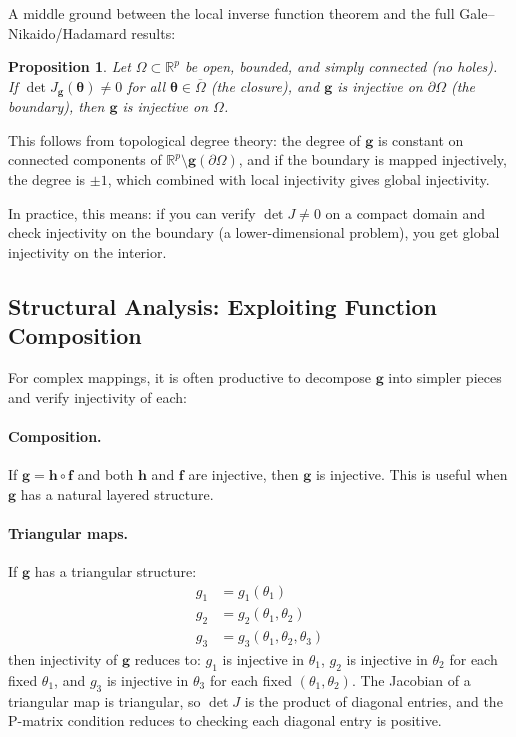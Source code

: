 \documentclass[11pt,a4paper]{article}
\newtheorem{proposition}[theorem]{Proposition}
\theoremstyle{definition}
\newcommand{\btheta}{\boldsymbol{\theta}}
\begin{document}
A middle ground between the local inverse function theorem and the full
Gale--Nikaido/Hadamard results:

\begin{proposition}
\label{prop:constant_sign}
Let $\Omega \subset \mathbb{R}^p$ be open, bounded, and simply connected
(no holes). If $\det J_{\mathbf{g}}(\btheta) \neq 0$ for all
$\btheta \in \overline{\Omega}$ (the closure), and $\mathbf{g}$ is injective
on $\partial\Omega$ (the boundary), then $\mathbf{g}$ is injective on $\Omega$.
\end{proposition}

This follows from topological degree theory: the degree of $\mathbf{g}$ is
constant on connected components of $\mathbb{R}^p \setminus
\mathbf{g}(\partial\Omega)$, and if the boundary is mapped injectively, the
degree is $\pm 1$, which combined with local injectivity gives global
injectivity.

In practice, this means: if you can verify $\det J \neq 0$ on a compact
domain and check injectivity on the boundary (a lower-dimensional problem),
you get global injectivity on the interior.


\subsection{Structural Analysis: Exploiting Function Composition}

For complex mappings, it is often productive to decompose $\mathbf{g}$ into
simpler pieces and verify injectivity of each:

\paragraph{Composition.} If $\mathbf{g} = \mathbf{h} \circ \mathbf{f}$ and
both $\mathbf{h}$ and $\mathbf{f}$ are injective, then $\mathbf{g}$ is
injective. This is useful when $\mathbf{g}$ has a natural layered structure.

\paragraph{Triangular maps.} If $\mathbf{g}$ has a triangular structure:
\begin{align}
    g_1 &= g_1(\theta_1) \\
    g_2 &= g_2(\theta_1, \theta_2) \\
    g_3 &= g_3(\theta_1, \theta_2, \theta_3)
\end{align}
then injectivity of $\mathbf{g}$ reduces to: $g_1$ is injective in $\theta_1$,
$g_2$ is injective in $\theta_2$ for each fixed $\theta_1$, and $g_3$ is
injective in $\theta_3$ for each fixed $(\theta_1, \theta_2)$. The Jacobian of
a triangular map is triangular, so $\det J$ is the product of diagonal entries,
and the P-matrix condition reduces to checking each diagonal entry is positive.
\end{document}
